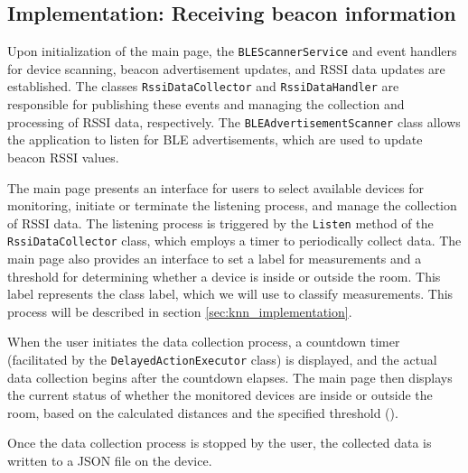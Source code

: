 \subsection{Implementation: Receiving beacon information}\label{sec:ble_implementation}
Upon initialization of the main page, the \texttt{BLEScannerService} and event handlers for device scanning, beacon advertisement updates, and RSSI data updates are established. 
The classes \texttt{RssiDataCollector} and \texttt{RssiDataHandler} are responsible for publishing these events and managing the collection and processing of RSSI data, respectively.
The \texttt{BLEAdvertisementScanner} class allows the application to listen for BLE advertisements, which are used to update beacon RSSI values.

The main page presents an interface for users to select available devices for monitoring, initiate or terminate the listening process, and manage the collection of RSSI data. 
The listening process is triggered by the \texttt{Listen} method of the \texttt{RssiDataCollector} class, which employs a timer to periodically collect data. 
The main page also provides an interface to set a label for measurements and a threshold for determining whether a device is inside or outside the room. 
This label represents the class label, which we will use to classify measurements. 
This process will be described in section \ref{sec:knn_implementation}.

When the user initiates the data collection process, a countdown timer (facilitated by the \texttt{DelayedActionExecutor} class) is displayed, and the actual data collection begins after the countdown elapses.
The main page then displays the current status of whether the monitored devices are inside or outside the room, based on the calculated distances and the specified threshold ().

Once the data collection process is stopped by the user, the collected data is written to a JSON file on the device.


